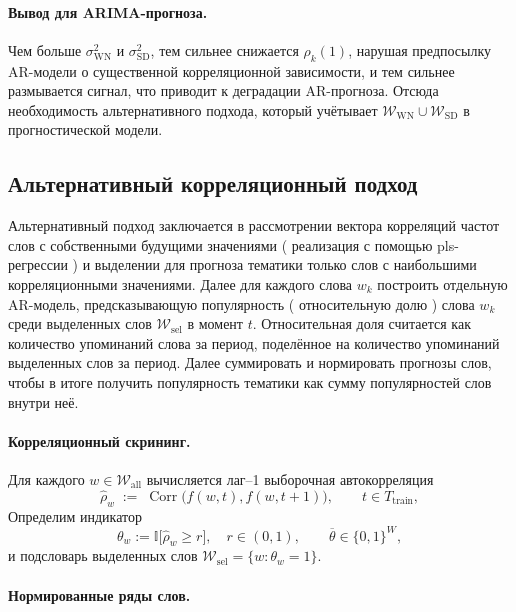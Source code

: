 \documentclass[14pt,a4paper]{article}
\begin{document}
\paragraph{Вывод для ARIMA-прогноза.}
Чем больше $\sigma_{\mathrm{WN}}^{2}$ и $\sigma_{\mathrm{SD}}^{2}$, тем сильнее
снижается $\rho_{k}(1)$, нарушая предпосылку AR-модели о существенной
корреляционной зависимости, и тем сильнее размывается сигнал, что приводит к деградации AR-прогноза.
Отсюда необходимость альтернативного подхода, который учётывает $\mathcal{W}_{\mathrm{WN}}\cup\mathcal{W}_{\mathrm{SD}}$ в прогностической модели.



\newpage
\subsection{Альтернативный корреляционный подход}
\label{ssec:alt}

Альтернативный подход заключается в рассмотрении вектора корреляций частот слов с собственными будущими значениями ( реализация с помощью pls-регрессии ) и выделении для прогноза тематики только слов с наибольшими корреляционными значениями.
Далее для каждого слова $w_k$ построить отдельную AR-модель, предсказывающую популярность ( относительную долю ) слова $w_k$ среди выделенных слов $\mathcal{W}_{\mathrm{sel}}$ в момент $t$.
Относительная доля считается как количество упоминаний слова за период, поделённое на количество упоминаний выделенных слов за период.
Далее суммировать и нормировать прогнозы слов, чтобы в итоге получить популярность тематики как сумму популярностей слов внутри неё.

\paragraph{Корреляционный скрининг.}
Для каждого $w\in\mathcal{W}_{\mathrm{all}}$ вычисляется лаг–1 выборочная автокорреляция  
\[
  \widehat\rho_{w}
  \;:=\;
  \operatorname{Corr}\!\bigl(f(w,t),f(w,t+1)\bigr), 
  \qquad t\in T_{\mathrm{train}},
\]
Определим индикатор
\[
  \theta_{w}:=\mathbb{I}\!\bigl[\widehat\rho_{w}\ge r\bigr],
  \quad
  r\in(0,1),
  \qquad
  \overline{\theta}\in\{0,1\}^{W},
\]
и подсловарь выделенных слов
\(
  \mathcal{W}_{\mathrm{sel}}=\{w:\theta_{w}=1\}.
\)



\paragraph{Нормированные ряды слов.}
\end{document}
